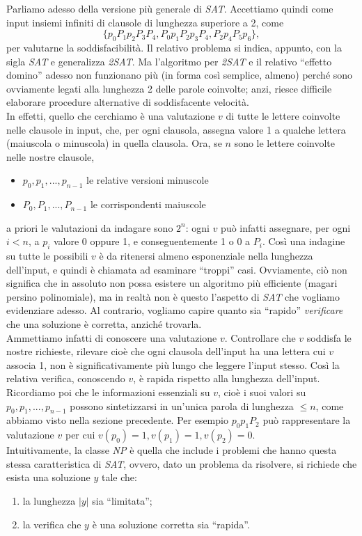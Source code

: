 \documentclass[12pt,a4paper]{report}
\theoremstyle{definition}
\begin{document}
Parliamo adesso della versione più generale di \emph{SAT}. Accettiamo quindi come input insiemi infiniti di clausole di lunghezza superiore a 2, come
$$\{p_0 P_1 p_2 P_3 P_4, P_0 p_1 P_2 p_3 P_4, P_2 p_4 P_5 p_6\},$$
per valutarne la soddisfacibilità. Il relativo problema si indica, appunto, con la sigla \emph{SAT} e generalizza \emph{2SAT}. Ma l'algoritmo per \emph{2SAT} e il relativo ``effetto domino'' adesso non funzionano più (in forma così semplice, almeno) perché sono ovviamente legati alla lunghezza 2 delle parole coinvolte; anzi, riesce difficile elaborare procedure alternative di soddisfacente velocità.\\
In effetti, quello che cerchiamo è una valutazione $v$ di tutte le lettere coinvolte nelle clausole in input, che, per ogni clausola, assegna valore 1 a qualche lettera (maiuscola o minuscola) in quella clausola. Ora, se $n$ sono le lettere coinvolte nelle nostre clausole, 
\begin{itemize}
\item $p_0, p_1,..., p_{n-1}$ le relative versioni minuscole
\item $P_0, P_1,..., P_{n-1}$ le corrispondenti maiuscole
\end{itemize}
a priori le valutazioni da indagare sono $2^n$: ogni $v$ può infatti assegnare, per ogni $i<n$, a $p_i$ valore 0 oppure 1, e conseguentemente 1 o 0 a $P_i$. Così una indagine su tutte le possibili $v$ è da ritenersi almeno esponenziale nella lunghezza dell'input, e quindi è chiamata ad esaminare ``troppi'' casi. Ovviamente, ciò non significa che in assoluto non possa esistere un algoritmo più efficiente (magari persino polinomiale), ma in realtà non è questo l'aspetto di \emph{SAT} che vogliamo evidenziare adesso. Al contrario, vogliamo capire quanto sia ``rapido'' \emph{verificare} che una soluzione è corretta, anziché trovarla.\\
Ammettiamo infatti di conoscere una valutazione $v$. Controllare che $v$ soddisfa le nostre richieste, rilevare cioè che ogni clausola dell'input ha una lettera cui $v$ associa 1, non è significativamente più lungo che leggere l'input stesso. Così la relativa verifica, conoscendo $v$, è rapida rispetto alla lunghezza dell'input. Ricordiamo poi che le informazioni essenziali su $v$, cioè i suoi valori su $p_0, p_1,..., p_{n-1}$ possono sintetizzarsi in un'unica parola di lunghezza $\leq n$, come abbiamo visto nella sezione precedente. Per esempio $p_0 p_1 P_2$ può rappresentare la valutazione $v$ per cui $v(p_0)=1, v(p_1)=1, v(p_2)=0$.\\
Intuitivamente, la classe \emph{NP} è quella che include i problemi che hanno questa stessa caratteristica di \emph{SAT}, ovvero, dato un problema da risolvere, si richiede che esista una soluzione $y$ tale che: 
\begin{enumerate}
\item la lunghezza $|y|$ sia ``limitata'';
\item la verifica che $y$ è una soluzione corretta sia ``rapida''.
\end{enumerate}
\end{document}

